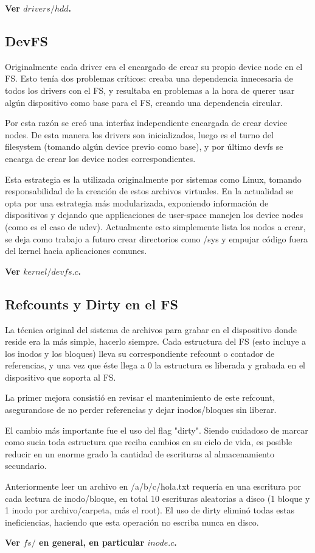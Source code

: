 \textbf{Ver $drivers/hdd$.}

\subsection{DevFS}

Originalmente cada driver era el encargado de crear su propio device node en el
FS. Esto tenía dos problemas críticos: creaba una dependencia innecesaria de todos
los drivers con el FS, y resultaba en problemas a la hora de querer usar algún
dispositivo como base para el FS, creando una dependencia circular.

Por esta razón se creó una interfaz independiente encargada de crear device
nodes. De esta manera los drivers son inicializados, luego es el turno del
filesystem (tomando algún device previo como base), y por último devfs se
encarga de crear los device nodes correspondientes.

Esta estrategia es la utilizada originalmente por sistemas como Linux, tomando
responsabilidad de la creación de estos archivos virtuales. En la actualidad se
opta por una estrategia más modularizada, exponiendo información de dispositivos
y dejando que applicaciones de user-space manejen los device nodes (como es el
caso de udev). Actualmente esto simplemente lista los nodos a crear, se deja como
trabajo a futuro crear directorios como /sys y empujar código fuera del kernel
hacia aplicaciones comunes.

\textbf{Ver $kernel/devfs.c$.}

\subsection{Refcounts y Dirty en el FS}

La técnica original del sistema de archivos para grabar en el dispositivo donde
reside era la más simple, hacerlo siempre. Cada estructura del FS (esto incluye
a los inodos y los bloques) lleva su correspondiente refcount o contador de
referencias, y una vez que éste llega a 0 la estructura es liberada y grabada en
el dispositivo que soporta al FS.

La primer mejora consistió en revisar el mantenimiento de este refcount,
asegurandose de no perder referencias y dejar inodos/bloques sin liberar.

El cambio más importante fue el uso del flag "dirty". Siendo cuidadoso de marcar como
sucia toda estructura que reciba cambios en su ciclo de vida, es posible reducir
en un enorme grado la cantidad de escrituras al almacenamiento secundario.

Anteriormente leer un archivo en /a/b/c/hola.txt requería en
una escritura por cada lectura de inodo/bloque, en total 10 escrituras
aleatorias a disco (1 bloque y 1 inodo por archivo/carpeta, más el root).
El uso de dirty eliminó todas estas ineficiencias, haciendo que esta
operación no escriba nunca en disco.

\textbf{Ver $fs/$ en general, en particular $inode.c$.}
